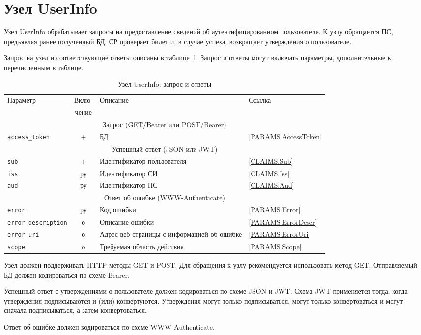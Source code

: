 \section{Узел UserInfo}\label{OIDC.UserInfo}

Узел UserInfo обрабатывает запросы на предоставление сведений 
об аутентифицированном пользователе. 
% 
К узлу обращается ПС, предъявляя ранее полученный БД.
%
СР проверяет билет и, в случае успеха, возвращает утверждения о пользователе.


Запрос на узел и соответствующие ответы описаны в 
таблице~\ref{Table.OIDC.UserInfo}.
%
Запрос и ответы могут включать параметры, дополнительные к перечисленным в 
таблице.

\begin{table}[H]
\caption{Узел UserInfo: запрос и ответы}\label{Table.OIDC.UserInfo}  
\begin{tabular}{|l|c|p{8.9cm}|l|}
\hline
\multirow{2}{*}{Параметр} & Вклю- & \multirow{2}{*}{Описание} & \multirow{2}{*}{Ссылка}\\
                          & чение &&\\
\hline
\hline
\multicolumn{4}{|c|}{Запрос (GET/Bearer или POST/Bearer)}\\
\hline
\hline
%
\lstinline!access_token! & + & 
БД & 
\ref{PARAMS.AccessToken}\\
\hline
%
\hline
\multicolumn{4}{|c|}{Успешный ответ (JSON или JWT)}\\
\hline
\hline
%
\lstinline!sub! & + &
Идентификатор пользователя & 
\ref{CLAIMS.Sub}\\
\hline
%
\lstinline!iss! & ру & 
Идентификатор СИ & 
\ref{CLAIMS.Iss}\\
\hline
%
\lstinline!aud! & ру & 
Идентификатор ПС & 
\ref{CLAIMS.Aud}\\
\hline
%
\hline
\multicolumn{4}{|c|}{Ответ об ошибке (WWW-Authenticate)}\\
\hline
\hline
%
\lstinline!error! & ру & 
Код ошибки & 
\ref{PARAMS.Error}\\
\hline
%
\lstinline!error_description! & о & 
Описание ошибки &
\ref{PARAMS.ErrorDescr}\\
\hline
%
\lstinline!error_uri! & о & 
Адрес веб-страницы с информацией об ошибке &
\ref{PARAMS.ErrorUri}\\
\hline
%
\lstinline!scope! & o & 
Требуемая область действия & 
\ref{PARAMS.Scope}\\
\hline
\end{tabular}
\end{table}


Узел должен поддерживать HTTP-методы GET и POST. Для обращения к узлу 
рекомендуется использовать метод GET. 
%
Отправляемый БД должен кодироваться по схеме Bearer.

Успешный ответ с утверждениями о пользователе должен кодироваться по схеме JSON 
и JWT. 
%
Схема JWT применяется тогда, когда утверждения подписываются и (или) 
конвертуются. 
%
Утверждения могут только подписываться, могут только конвертоваться и могут 
сначала подписываться, а затем конвертоваться.

Ответ об ошибке должен кодироваться по схеме WWW-Authenticate.
